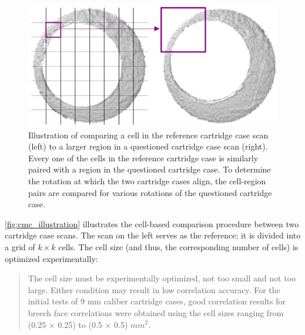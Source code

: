 \begin{Schunk}
\begin{figure}[htbp]

{\centering \includegraphics[width=.75\textwidth]{images/cmc_illustration} 

}

\caption{\label{fig:cmc_illustration} Illustration of comparing a cell in the reference cartridge case scan (left) to a larger region in a questioned cartridge case scan (right). Every one of the cells in the reference cartridge case is similarly paired with a region in the questioned cartridge case.  To determine the rotation at which the two cartridge cases align, the cell-region pairs are compared for various rotations of the questioned cartridge case.}\label{fig:unnamed-chunk-11}
\end{figure}
\end{Schunk}

\autoref{fig:cmc_illustration} illustrates the cell-based comparison
procedure between two cartridge case scans. The scan on the left serves
as the reference; it is divided into a grid of \(k \times k\) cells. The
cell size (and thus, the corresponding number of cells) is optimized
experimentally:

\begin{quote}
The cell size must be experimentally optimized, not too small and not
too large. Either condition may result in low correlation accuracy. For
the initial tests of 9 mm caliber cartridge cases, good correlation
results for breech face correlations were obtained using the cell sizes
ranging from (0.25 × 0.25) to (0.5 × 0.5) \(mm^2\). \citep{song_3d_2014}
\end{quote}

